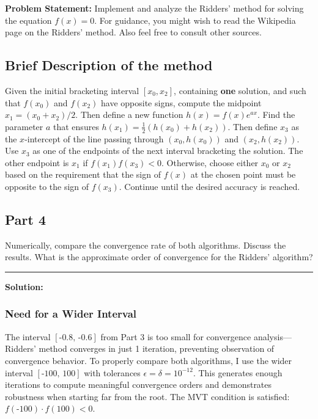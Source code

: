 \clearpage
{}

\textbf{Problem Statement:} Implement and analyze the Ridders' method for solving the equation $f(x) = 0$. For guidance, you might wish to read the Wikipedia page on the Ridders' method. Also feel free to consult other sources.

\subsection*{Brief Description of the method}

Given the initial bracketing interval $[x_0, x_2]$, containing \textbf{one} solution, and such that $f(x_0)$ and $f(x_2)$ have opposite signs, compute the midpoint $x_1 = (x_0 + x_2)/2$. Then define a new function $h(x) = f(x)e^{ax}$. Find the parameter $a$ that ensures $h(x_1) = \frac{1}{2}(h(x_0) + h(x_2))$. Then define $x_3$ as the $x$-intercept of the line passing through $(x_0, h(x_0))$ and $(x_2, h(x_2))$. Use $x_3$ as one of the endpoints of the next interval bracketing the solution. The other endpoint is $x_1$ if $f(x_1)f(x_3) < 0$. Otherwise, choose either $x_0$ or $x_2$ based on the requirement that the sign of $f(x)$ at the chosen point must be opposite to the sign of $f(x_3)$. Continue until the desired accuracy is reached.

\subsection*{Part 4}

Numerically, compare the convergence rate of both algorithms. Discuss the results. What is the approximate order of convergence for the Ridders' algorithm?

\noindent\rule{\textwidth}{0.4pt}

\vspace{1em}

\textbf{Solution:}

\subsubsection*{Need for a Wider Interval}

The interval $[\text{-}0.8,\,\text{-}0.6]$ from Part 3 is too small for convergence analysis---Ridders' method converges in just 1 iteration, preventing observation of convergence behavior. To properly compare both algorithms, I use the wider interval $[\text{-}100,\,100]$ with tolerances $\epsilon = \delta = 10^{-12}$. This generates enough iterations to compute meaningful convergence orders and demonstrates robustness when starting far from the root. The MVT condition is satisfied: $f(\text{-}100) \cdot f(100) < 0$.

